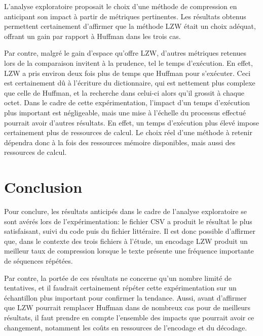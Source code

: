 \documentclass[12pt,letterpaper]{article}
\begin{document}
L'analyse exploratoire proposait le choix d'une méthode de compression en anticipant son impact à partir de métriques pertinentes.
Les résultats obtenus permettent certainement d'affirmer que la méthode LZW était un choix adéquat, offrant un gain par rapport à Huffman dans les trois cas. 

Par contre, malgré le gain d'espace qu'offre LZW, d'autres métriques retenues lors de la comparaison invitent à la prudence, tel le temps d'exécution.
En effet, LZW a pris environ deux fois plus de temps que Huffman pour s'exécuter.
Ceci est certainement dû à l'écriture du dictionnaire, qui est nettement plus complexe que celle de Huffman, et la recherche dans celui-ci alors qu'il grossit à chaque octet.
Dans le cadre de cette expérimentation, l'impact d'un temps d'exécution plus important est négligeable, mais une mise à l'échelle du processus effectué pourrait avoir d'autres résultats.
En effet, un temps d'exécution plus élevé impose certainement plus de ressources de calcul.
Le choix réel d'une méthode à retenir dépendra donc à la fois des ressources mémoire disponibles, mais aussi des ressources de calcul.

\section{Conclusion}
\label{sec:conclusion}

Pour conclure, les résultats anticipés dans le cadre de l'analyse exploratoire se sont avérés lors de l'expérimentation: le fichier CSV a produit le résultat le plus satisfaisant, suivi du code puis du fichier littéraire.
Il est donc possible d'affirmer que, dans le contexte des trois fichiers à l'étude, un encodage LZW produit un meilleur taux de compression lorsque le texte présente une fréquence importante de séquences répétées.

Par contre, la portée de ces résultats ne concerne qu'un nombre limité de tentatives, et il faudrait certainement répéter cette expérimentation sur un échantillon plus important pour confirmer la tendance.
Aussi, avant d'affirmer que LZW pourrait remplacer Huffman dans de nombreux cas pour de meilleurs résultats, il faut prendre en compte l'ensemble des impacts que pourrait avoir ce changement, notamment les coûts en ressources de l'encodage et du décodage.
\end{document}
